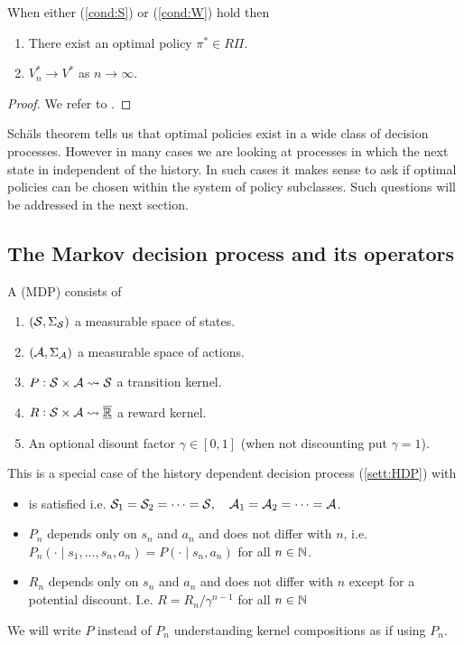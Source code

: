 \begin{thm}[Schäl]
  When either (\cref{cond:S}) or (\cref{cond:W}) hold then
  \begin{enumerate}
    \item There exist an optimal policy $\pi^* \in R\Pi$.
    \item $V^*_n \to V^*$ as $n \to \infty$.
  \end{enumerate}
  \label{thm:SchalExi}
\end{thm}
\begin{proof}
  We refer to . %
\end{proof}

Schäls theorem tells us that optimal policies exist in a wide class
of decision processes. However in many cases we are looking at processes
in which the next state in independent of the history.
In such cases it makes sense to ask if optimal policies can be chosen
within the system of policy subclasses.
Such questions will be addressed in the next section.

\subsection{The Markov decision process and its operators}

\begin{defn}
  A  (MDP) consists of
  \begin{enumerate}
    \item $(\mathcal{S}, \Sigma_{\mathcal{S}})$ a 
      measurable space of states.
    \item $(\mathcal{A}, \Sigma_{\mathcal{A}})$ a 
      measurable space of actions.
    \item $P : \mathcal{S} \times \mathcal{A} \leadsto \mathcal{S}$
      a transition kernel.
    \item $R : \mathcal{S} \times \mathcal{A} \leadsto \overline{\underline{\mathbb{R}}}$
      a reward kernel.
    \item An optional disount factor $\gamma \in [0,1]$
      (when not discounting put $\gamma = 1$).
  \end{enumerate}
  \label{sett:MDP}
\end{defn}
This is a special case of the
history dependent decision process (\cref{sett:HDP}) with
\begin{itemize}
  \item {} is satisfied i.e. 
    $\mathcal{S}_1 = \mathcal{S}_2 = \dots = \mathcal{S},
    \quad \mathcal{A}_1 = \mathcal{A}_2 = \dots = \mathcal{A}$.
  \item $P_n$ depends only on $s_n$ and $a_n$ and does not
    differ with $n$, i.e. 
    $P_n(\cdot \mid s_1, \dots, s_n, a_n) = P(\cdot \mid s_n, a_n)$
    for all $n \in \mathbb{N}$.
  \item $R_n$ depends only on $s_n$ and $a_n$ and does not differ
    with $n$ except for a potential discount.
    I.e. $R = R_n/\gamma^{n-1}$ for all $n \in \mathbb{N}$
\end{itemize}
We will write $P$ instead of $P_n$ understanding
kernel compositions as if using $P_n$.

